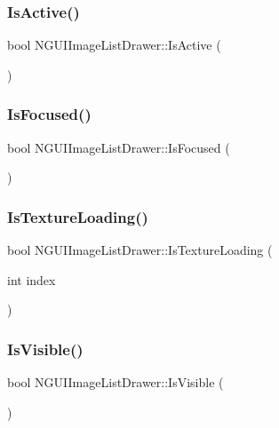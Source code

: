 \subsubsection{\texorpdfstring{Is\+Active()}{IsActive()}}
{\footnotesize\ttfamily bool N\+G\+U\+I\+Image\+List\+Drawer\+::\+Is\+Active (\begin{DoxyParamCaption}{ }\end{DoxyParamCaption})}

\hypertarget{class_n_g_u_i_image_list_drawer_ac5a28b6336044ae71c0504b5fd117960}{}\label{class_n_g_u_i_image_list_drawer_ac5a28b6336044ae71c0504b5fd117960} 
\subsubsection{\texorpdfstring{Is\+Focused()}{IsFocused()}}
{\footnotesize\ttfamily bool N\+G\+U\+I\+Image\+List\+Drawer\+::\+Is\+Focused (\begin{DoxyParamCaption}{ }\end{DoxyParamCaption})}

\hypertarget{class_n_g_u_i_image_list_drawer_a6f5bdfa0d6e59d07212d73a9bdc45b63}{}\label{class_n_g_u_i_image_list_drawer_a6f5bdfa0d6e59d07212d73a9bdc45b63} 
\subsubsection{\texorpdfstring{Is\+Texture\+Loading()}{IsTextureLoading()}}
{\footnotesize\ttfamily bool N\+G\+U\+I\+Image\+List\+Drawer\+::\+Is\+Texture\+Loading (\begin{DoxyParamCaption}\item[{int}]{index }\end{DoxyParamCaption})}

\hypertarget{class_n_g_u_i_image_list_drawer_a3ffc382b7b5cd24337968355ac7cd418}{}\label{class_n_g_u_i_image_list_drawer_a3ffc382b7b5cd24337968355ac7cd418} 
\subsubsection{\texorpdfstring{Is\+Visible()}{IsVisible()}}
{\footnotesize\ttfamily bool N\+G\+U\+I\+Image\+List\+Drawer\+::\+Is\+Visible (\begin{DoxyParamCaption}{ }\end{DoxyParamCaption})}

